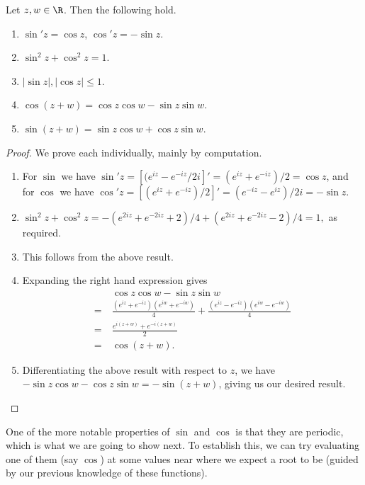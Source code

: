 \begin{proposition}
	Let $z, w \in \R$. Then the following hold.
	\begin{enumerate}[label=(\roman*)]
		\item $\sin' z = \cos z$, $\cos' z = -\sin z$.
		\item $\sin^2 z + \cos^2 z = 1$.
		\item $|\sin z|, |\cos z| \leq 1$.
		\item $\cos(z + w) = \cos z \cos w - \sin z \sin w$.
		\item $\sin(z + w) = \sin z \cos w + \cos z \sin w$.
	\end{enumerate}
\end{proposition}
\begin{proof}
	We prove each individually, mainly by computation.
	\begin{enumerate}[label=(\roman*)]
		\item For $\sin$ we have $\sin' z = \left[(e^{iz} - e^{-iz}/2i\right]' = (e^{iz} + e^{-iz})/2 = \cos z$, and for $\cos$ we have $\cos' z = \left[(e^{iz} + e^{-iz})/2\right]' = (e^{-iz} - e^{iz})/2i = -\sin z$.
		\item
		$
		\sin^2 z + \cos^2 z = -(e^{2iz} + e^{-2iz} + 2)/4 + (e^{2iz} + e^{-2iz} - 2)/4 = 1,
		$
		as required.
		\item This follows from the above result.
		\item Expanding the right hand expression gives 
		\begin{align*}
				&\cos z \cos w-\sin z \sin w \\
				=\ &\frac{\left(e^{i z}+e^{-i z}\right)\left(e^{i w}+e^{-i w}\right)}{4}+\frac{\left(e^{i z}-e^{-i z}\right)\left(e^{i w}-e^{-i w}\right)}{4} \\
				=\ &\frac{e^{i(z+w)}+e^{-i(z+w)}}{2} \\
				=\ &\cos (z+w).
		\end{align*}
		\item Differentiating the above result with respect to $z$, we have $-\sin z \cos w - \cos z \sin w = - \sin (z + w)$, giving us our desired result. \qedhere
	\end{enumerate}
\end{proof}

One of the more notable properties of $\sin$ and $\cos$ is that they are periodic, which is what we are going to show next. To establish this, we can try evaluating one of them (say $\cos$) at some values near where we expect a root to be (guided by our previous knowledge of these functions).

